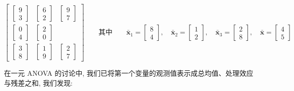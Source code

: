 $$
\left[\begin{array}{ccc}
\begin{bmatrix}9\\3\end{bmatrix} & \begin{bmatrix}6\\2\end{bmatrix} & \begin{bmatrix}9\\7\end{bmatrix}\\[8pt]
\begin{bmatrix}0\\4\end{bmatrix} & \begin{bmatrix}2\\0\end{bmatrix} & \\[8pt]
\begin{bmatrix}3\\8\end{bmatrix} & \begin{bmatrix}1\\9\end{bmatrix} & \begin{bmatrix}2\\7\end{bmatrix}
\end{array}\right]
\qquad\text{其中}\qquad
\bar{\mathbf{x}}_1=\begin{bmatrix}8\\4\end{bmatrix},\quad
\bar{\mathbf{x}}_2=\begin{bmatrix}1\\2\end{bmatrix},\quad
\bar{\mathbf{x}}_3=\begin{bmatrix}2\\8\end{bmatrix},\quad
\bar{\mathbf{x}}=\begin{bmatrix}4\\5\end{bmatrix}
$$

在一元 ANOVA 的讨论中, 我们已将第一个变量的观测值表示成总均值、处理效应与残差之和, 我们发现:


